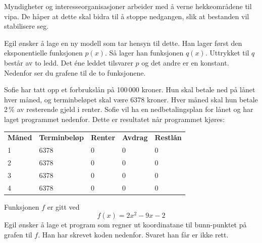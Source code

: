 Myndigheter og interesseorganisasjoner arbeider med å verne hekkeområdene
til vipa. De håper at dette skal bidra til å stoppe nedgangen, slik at
bestanden vil stabilisere seg. \os

Egil ønsker å lage en ny modell som tar hensyn til dette. Han lager først
den eksponentielle funksjonen $p(x)$. Så lager han funksjonen $q(x)$. Uttrykket til $q$ består av to ledd. Det éne leddet tilsvarer $p$ og det andre er en konstant. Nedenfor ser du grafene til de to funksjonene.

Sofie har tatt opp et forbrukslån på 100\,000 kroner. Hun skal betale ned på lånet hver måned, og terminbeløpet skal være 6378 kroner. Hver måned skal hun betale 2\,\% av resterende gjeld i renter.
Sofie vil ha en nedbetalingsplan for lånet og har laget programmet nedenfor.
Dette er resultatet når programmet kjøres:
\begin{center}
	\small
	\ttfamily
	\begin{tabular}{lllll}
		\textbf{Måned} & \textbf{Terminbeløp} & \textbf{Renter} & \textbf{Avdrag} & \textbf{Restlån} \\
		1 & 6378 & 0 & 0 & 0 \\
		2 & 6378 & 0 & 0 & 0 \\
		3 & 6378 & 0 & 0 & 0 \\
		4 & 6378 & 0 & 0 & 0 \\
	\end{tabular}
\end{center}
Funksjonen $ f $ er gitt ved
\[ f(x)=2x^2-9x-2 \]
Egil ønsker å lage et program som regner ut koordinatane til bunn-punktet på grafen til $ f $. Han har skrevet koden nedenfor.
Svaret han får er ikke rett.


